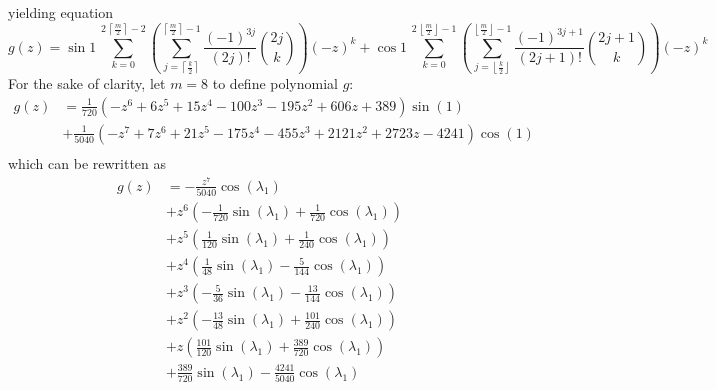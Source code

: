yielding equation
\begin{equation}
  g(z) = \sin{1}\,\sum_{k=0}^{2\,\left\lceil \frac{m}{2} \right\rceil-2}{\left(\sum_{j=\left\lceil \frac{k}{2}\right\rceil}^{\left\lceil \frac{m}{2} \right\rceil -1}{\frac{(-1)^{3j}}{(2j)!}{2j\choose k}}\right) {(-z)^{k}}}
       + \cos{1}\,\sum_{k=0}^{2\,\left\lfloor \frac{m}{2} \right\rfloor-1}{\left(\sum_{j=\left\lfloor \frac{k}{2}\right\rfloor}^{\left\lfloor \frac{m}{2} \right\rfloor -1}{\frac{(-1)^{3j+1}}{(2j + 1)!} {2j+1\choose k}}\right){(-z)^{k}}}
\end{equation}
For the sake of clarity, let $m=8$ to define polynomial $g$:
\begin{displaymath}
\begin{split}
g{\left (z \right )} &= \frac{1}{720} \left(- z^{6} + 6 z^{5} + 15 z^{4} - 100 z^{3} - 195 z^{2} + 606 z + 389\right) \sin{\left (1 \right )} \\
                     &+ \frac{1}{5040} \left(- z^{7} + 7 z^{6} + 21 z^{5} - 175 z^{4} - 455 z^{3} + 2121 z^{2} + 2723 z - 4241\right) \cos{\left (1 \right )} \\
\end{split}
\end{displaymath}
which can be rewritten as
\begin{displaymath}
\begin{split}
g{\left (z \right )} &= - \frac{z^{7}}{5040} \cos{\left (\lambda_{1} \right )} \\
                     &+ z^{6} \left(- \frac{1}{720} \sin{\left (\lambda_{1} \right )} + \frac{1}{720} \cos{\left (\lambda_{1} \right )}\right) \\
                     &+ z^{5} \left(\frac{1}{120} \sin{\left (\lambda_{1} \right )} + \frac{1}{240} \cos{\left (\lambda_{1} \right )}\right) \\
                     &+ z^{4} \left(\frac{1}{48} \sin{\left (\lambda_{1} \right )} - \frac{5}{144} \cos{\left (\lambda_{1} \right )}\right) \\
                     &+ z^{3} \left(- \frac{5}{36} \sin{\left (\lambda_{1} \right )} - \frac{13}{144} \cos{\left (\lambda_{1} \right )}\right) \\
                     &+ z^{2} \left(- \frac{13}{48} \sin{\left (\lambda_{1} \right )} + \frac{101}{240} \cos{\left (\lambda_{1} \right )}\right) \\
                     &+ z \left(\frac{101}{120} \sin{\left (\lambda_{1} \right )} + \frac{389}{720} \cos{\left (\lambda_{1} \right )}\right) \\
                     &+ \frac{389}{720} \sin{\left (\lambda_{1} \right )} - \frac{4241}{5040} \cos{\left (\lambda_{1} \right )}
\end{split}
\end{displaymath}

